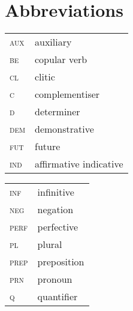 \documentclass[output=paper]{langsci/langscibook}
\begin{document}
\section*{\textbf{Abbreviations}}

\begin{tabularx}{.45\textwidth}{lX}
\textsc{aux} & auxiliary\\

\textsc{be} & copular verb\\

\textsc{cl} & clitic\\

\textsc{c} & complementiser\\

\textsc{d} & determiner\\

\textsc{dem} & demonstrative\\

\textsc{fut} & future\\
 
\textsc{ind}  &  affirmative indicative \\
\end{tabularx}
\begin{tabularx}{.45\textwidth}{lX}
\textsc{inf} & infinitive\\

\textsc{neg} & negation\\

\textsc{perf} & perfective\\

\textsc{pl} & plural\\

\textsc{prep} & preposition\\

\textsc{prn} & pronoun\\

\textsc{q} & quantifier\\
\end{tabularx}

\printbibliography[heading=subbibliography,notkeyword=this]
\end{document}
